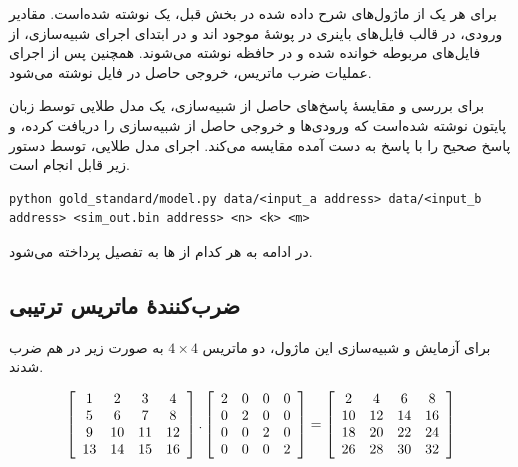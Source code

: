 \documentclass[conference]{IEEEtran-ModifiedForMVIP}
\begin{document}
برای هر یک از ماژول‌های شرح داده شده در بخش قبل، یک
نوشته شده‌است.
مقادیر ورودی، در قالب فایل‌های باینری در پوشهٔ
موجود اند و در ابتدای اجرای شبیه‌سازی، از فایل‌های مربوطه خوانده شده و در حافظه نوشته می‌شوند.
همچنین پس از اجرای عملیات ضرب ماتریس، خروجی حاصل در فایل
نوشته می‌شود.

برای بررسی و مقایسهٔ پاسخ‌های حاصل از شبیه‌سازی، یک مدل طلایی توسط زبان پایتون نوشته شده‌است
که ورودی‌ها و خروجی حاصل از شبیه‌سازی را دریافت کرده، و پاسخ صحیح را با پاسخ به دست آمده مقایسه می‌کند.
اجرای مدل طلایی، توسط دستور زیر قابل انجام است.

\begin{latin}
\begin{lstlisting}
python gold_standard/model.py data/<input_a address> data/<input_b address> <sim_out.bin address> <n> <k> <m>
\end{lstlisting}
\end{latin}

در ادامه به هر کدام از
ها
به تفصیل پرداخته می‌شود.

\subsection{
    ضرب‌کنندهٔ ماتریس ترتیبی
}

برای آزمایش و شبیه‌سازی این ماژول، دو ماتریس
$4 \times 4$
به صورت زیر در هم ضرب شدند.

\tiny
\begin{align}
    \left[
        \begin{array}{c c c c}
            1&2&3&4\\
            5&6&7&8\\
            9&10&11&12\\
            13&14&15&16
        \end{array}
    \right] . \left[
        \begin{array}{c c c c}
            2&0&0&0\\
            0&2&0&0\\
            0&0&2&0\\
            0&0&0&2
        \end{array}
    \right]
    = \left[
        \begin{array}{c c c c}
            2&4&6&8\\
            10&12&14&16\\
            18&20&22&24\\
            26&28&30&32
        \end{array}
    \right]
    \label{eq:SquareMatrix}
\end{align}
\normalsize
\end{document}
